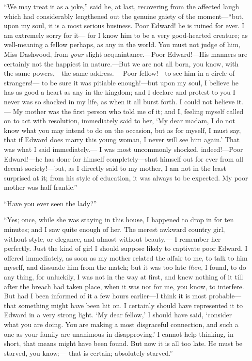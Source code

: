 ``We may treat it as a joke,'' said he, at last,
recovering from the affected laugh which had considerably
lengthened out the genuine gaiety of the moment---``but, upon
my soul, it is a most serious business.  Poor Edward!
he is ruined for ever.  I am extremely sorry for it---%
for I know him to be a very good-hearted creature; as
well-meaning a fellow perhaps, as any in the world.
You must not judge of him, Miss Dashwood, from \emph{your}
slight acquaintance.---Poor Edward!---His manners are certainly
not the happiest in nature.---But we are not all born,
you know, with the same powers,---the same address.---%
Poor fellow!---to see him in a circle of strangers!---%
to be sure it was pitiable enough!---but upon my soul,
I believe he has as good a heart as any in the kingdom;
and I declare and protest to you I never was so shocked in my
life, as when it all burst forth.  I could not believe it.---%
My mother was the first person who told me of it;
and I, feeling myself called on to act with resolution,
immediately said to her, `My dear madam, I do not know
what you may intend to do on the occasion, but as for myself,
I must say, that if Edward does marry this young woman,
I never will see him again.' That was what I said immediately.---%
I was most uncommonly shocked, indeed!---Poor Edward!---he has
done for himself completely---shut himself out for ever from
all decent society!---but, as I directly said to my mother,
I am not in the least surprised at it; from his style
of education, it was always to be expected.  My poor mother
was half frantic.''

``Have you ever seen the lady?''

``Yes; once, while she was staying in this house,
I happened to drop in for ten minutes; and I saw
quite enough of her.  The merest awkward country girl,
without style, or elegance, and almost without beauty.---%
I remember her perfectly.  Just the kind of girl I
should suppose likely to captivate poor Edward.
I offered immediately, as soon as my mother related
the affair to me, to talk to him myself, and dissuade
him from the match; but it was too late \emph{then}, I found,
to do any thing, for unluckily, I was not in the way
at first, and knew nothing of it till after the breach
had taken place, when it was not for me, you know,
to interfere.  But had I been informed of it a few
hours earlier---I think it is most probable---that something
might have been hit on.  I certainly should have represented
it to Edward in a very strong light.  `My dear fellow,'
I should have said, `consider what you are doing.
You are making a most disgraceful connection, and such a one
as your family are unanimous in disapproving.' I cannot
help thinking, in short, that means might have been found.
But now it is all too late.  He must be starved, you know;---%
that is certain; absolutely starved.''

